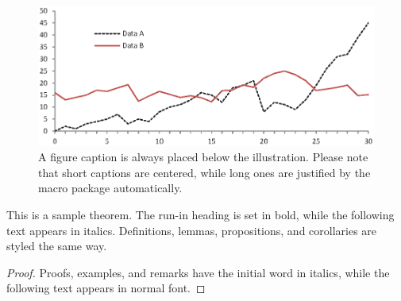 \documentclass[runningheads]{llncs}
\begin{document}
\begin{figure}
\includegraphics[width=\textwidth]{fig1.eps}
\caption{A figure caption is always placed below the illustration.
Please note that short captions are centered, while long ones are
justified by the macro package automatically.} \label{fig1}
\end{figure}

\begin{theorem}
This is a sample theorem. The run-in heading is set in bold, while
the following text appears in italics. Definitions, lemmas,
propositions, and corollaries are styled the same way.
\end{theorem}
%
%
\begin{proof}
Proofs, examples, and remarks have the initial word in italics,
while the following text appears in normal font.
\end{proof}
%
%
%


%





\end{document}
